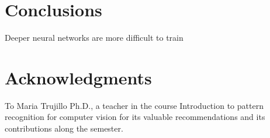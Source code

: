 \documentclass[12pt]{article}
\numberwithin{equation}{section}
\numberwithin{table}{section}
\numberwithin{figure}{section}
\begin{document}
\section{Conclusions}

Deeper neural networks are more difficult to train \cite{Zagoruyko2016}






\section*{Acknowledgments}

To Maria Trujillo Ph.D., a teacher in the course Introduction to pattern recognition for computer vision for its valuable recommendations and its contributions along the semester.
 




\end{document}
